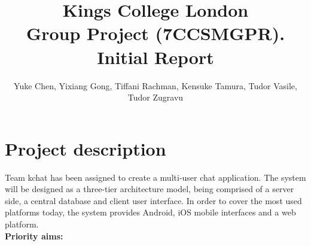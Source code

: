 \documentclass{article}
\author {Yuke Chen, Yixiang Gong, Tiffani Rachman, Kensuke Tamura, Tudor Vasile, Tudor Zugravu}
\title{Kings College London \\ Group Project  (7CCSMGPR).  \\ Initial Report}
\begin{document}
	\maketitle


	\paragraph{}
	\fontsize{12}{12}\selectfont
	
	\section{Project description}
	Team kchat has been assigned to create a multi-user chat application. The system will be designed as a three-tier architecture model, being comprised of a server side, a central database and client user interface. In order to cover the most used platforms today, the system provides Android, iOS mobile interfaces and a web platform.\\
	
	\textbf{Priority aims:}\\
	
\end{document}
